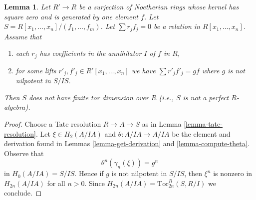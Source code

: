 \documentclass{stacks-project}
\theoremstyle{plain}
\newtheorem{lemma}[subsection]{Lemma}
\theoremstyle{definition}
\theoremstyle{remark}
\numberwithin{equation}{subsection}
\begin{document}
\begin{lemma}
\label{lemma-not-finite-pd}
Let $R' \to R$ be a surjection of Noetherian rings whose kernel has square
zero and is generated by one element $f$. Let
$S = R[x_1, \ldots, x_n]/(f_1, \ldots, f_m)$.
Let $\sum r_j f_j = 0$ be a relation in $R[x_1, \ldots, x_n]$.
Assume that
\begin{enumerate}
\item each $r_j$ has coefficients in the annihilator $I$ of $f$ in $R$,
\item for some lifts $r'_j, f'_j \in R'[x_1, \ldots, x_n]$ we have
$\sum r'_j f'_j = gf$ where $g$ is not nilpotent in $S/IS$.
\end{enumerate}
Then $S$ does not have finite tor dimension over $R$ (i.e., $S$ is not
a perfect $R$-algebra).
\end{lemma}

\begin{proof}
Choose a Tate resolution $R \to A \to S$ as in
Lemma \ref{lemma-tate-resolution}.
Let $\xi \in H_2(A/IA)$ and $\theta : A/IA \to A/IA$ be the element
and derivation found in Lemmas \ref{lemma-get-derivation} and
\ref{lemma-compute-theta}.
Observe that
$$
\theta^n(\gamma_n(\xi)) = g^n
$$
in $H_0(A/IA) = S/IS$.
Hence if $g$ is not nilpotent in $S/IS$, then $\xi^n$ is nonzero in
$H_{2n}(A/IA)$ for all $n > 0$. Since
$H_{2n}(A/IA) = \text{Tor}^R_{2n}(S, R/I)$ we conclude.
\end{proof}
\end{document}
